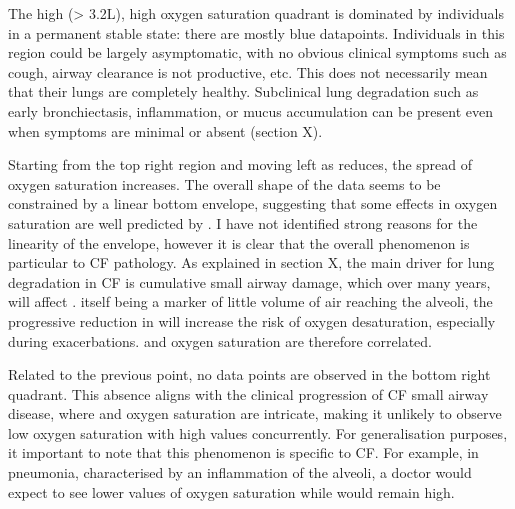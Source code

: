 The high \F (> 3.2L), high oxygen saturation quadrant is dominated by individuals in a permanent stable state: there are mostly blue datapoints. Individuals in this region could be largely asymptomatic, with no obvious clinical symptoms such as cough, airway clearance is not productive, etc. This does not necessarily mean that their lungs are completely healthy. Subclinical lung degradation such as early bronchiectasis, inflammation, or mucus accumulation can be present even when symptoms are minimal or absent (section X).

Starting from the top right region and moving left as \F reduces, the spread of oxygen saturation increases. The overall shape of the data seems to be constrained by a linear bottom envelope, suggesting that some effects in oxygen saturation are well predicted by \F. I have not identified strong reasons for the linearity of the envelope, however it is clear that the overall phenomenon is particular to CF pathology. As explained in section X, the main driver for lung degradation in CF is cumulative small airway damage, which over many years, will affect \F. \F itself being a marker of little volume of air reaching the alveoli, the progressive reduction in \F will increase the risk of oxygen desaturation, especially during exacerbations. \F and oxygen saturation are therefore correlated.


Related to the previous point, no data points are observed in the bottom right quadrant. This absence aligns with the clinical progression of CF small airway disease, where \F and oxygen saturation are intricate, making it unlikely to observe low oxygen saturation with high \F values concurrently. For generalisation purposes, it important to note that this phenomenon is specific to CF. For example, in pneumonia, characterised by an inflammation of the alveoli, a doctor would expect to see lower values of oxygen saturation while \F would remain high.

